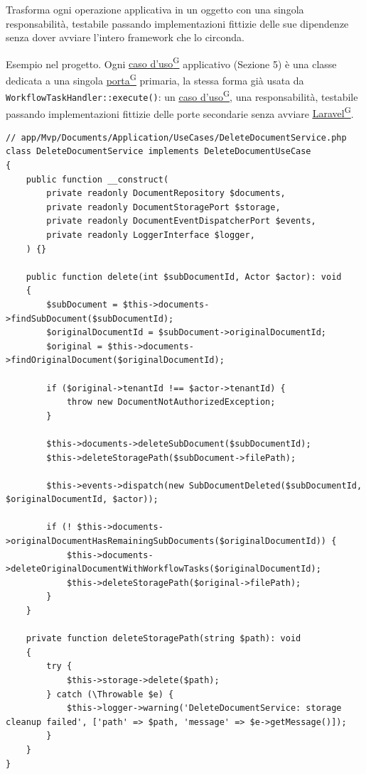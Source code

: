 \documentclass[a4paper,12pt]{article}
\providecommand{\glslink}[2]{\href{https://alittlebyte-19.github.io/Documentazione/glossario.html\#gls-#1}{\underline{#2}\textsuperscript{\scriptsize G}}}
\begin{document}
\begin{sloppypar}
Trasforma ogni operazione applicativa in un oggetto con una singola responsabilità, testabile passando implementazioni fittizie delle sue dipendenze senza dover avviare l'intero framework che lo circonda.

Esempio nel progetto. Ogni \glslink{caso-d-uso-uc}{caso d'uso} applicativo (Sezione 5) è una classe dedicata a una singola \glslink{porta}{porta} primaria, la stessa forma già usata da \texttt{WorkflowTaskHandler::execute()}: un \glslink{caso-d-uso-uc}{caso d'uso}, una responsabilità, testabile passando implementazioni fittizie delle porte secondarie senza avviare \glslink{laravel}{Laravel}.

\begin{lstlisting}[style=phplisting, caption={DeleteDocumentService: caso d'uso applicativo con una singola porta primaria (delete())}]
// app/Mvp/Documents/Application/UseCases/DeleteDocumentService.php
class DeleteDocumentService implements DeleteDocumentUseCase
{
    public function __construct(
        private readonly DocumentRepository $documents,
        private readonly DocumentStoragePort $storage,
        private readonly DocumentEventDispatcherPort $events,
        private readonly LoggerInterface $logger,
    ) {}

    public function delete(int $subDocumentId, Actor $actor): void
    {
        $subDocument = $this->documents->findSubDocument($subDocumentId);
        $originalDocumentId = $subDocument->originalDocumentId;
        $original = $this->documents->findOriginalDocument($originalDocumentId);

        if ($original->tenantId !== $actor->tenantId) {
            throw new DocumentNotAuthorizedException;
        }

        $this->documents->deleteSubDocument($subDocumentId);
        $this->deleteStoragePath($subDocument->filePath);

        $this->events->dispatch(new SubDocumentDeleted($subDocumentId, $originalDocumentId, $actor));

        if (! $this->documents->originalDocumentHasRemainingSubDocuments($originalDocumentId)) {
            $this->documents->deleteOriginalDocumentWithWorkflowTasks($originalDocumentId);
            $this->deleteStoragePath($original->filePath);
        }
    }

    private function deleteStoragePath(string $path): void
    {
        try {
            $this->storage->delete($path);
        } catch (\Throwable $e) {
            $this->logger->warning('DeleteDocumentService: storage cleanup failed', ['path' => $path, 'message' => $e->getMessage()]);
        }
    }
}
\end{lstlisting}


\end{sloppypar}
\end{document}
